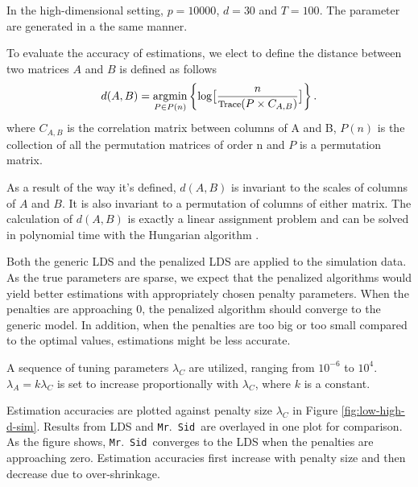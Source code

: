 \documentclass[fleqn]{article}
\let\oldref\ref
\renewcommand{\ref}[1]{(\oldref{#1})}
\newcommand{\mrsid}{{\sc \texttt{Mr}.~\texttt{Sid}}}
\newcommand{\argmin}{\operatornamewithlimits{argmin}}
\begin{document}
In the high-dimensional setting, $p = 10000$, $d = 30$ and $T = 100$. The parameter are generated in a the same manner.

To evaluate the accuracy of estimations, we elect to define the distance between two matrices $A$ and $B$ is defined as follows
\begin{equation}\label{eq:distance}
d(A,B) = \argmin_{P\in P(n)}\left\{\log\bigl[\frac{n}{\text{\footnotesize Trace}(P\times C_{A,B})}\bigr]\right\}.
\end{equation}
where $C_{A,B}$ is the correlation matrix between columns of A and B, $P(n)$ is the collection of all the permutation matrices of order n and $P$ is a permutation matrix.

As a result of the way it's defined, $d(A,B)$ is invariant to the scales of columns of $A$ and $B$. It is also invariant to a permutation of columns of either matrix. The calculation of $d(A,B)$ is exactly a linear assignment problem and can be solved in polynomial time with the Hungarian algorithm \cite{kuhn1955hungarian}.


Both the generic LDS and the penalized LDS are applied to the simulation data. As the true parameters are sparse, we expect that the penalized algorithms would yield better estimations with appropriately chosen penalty parameters. When the penalties are approaching 0, the penalized algorithm should converge to the generic model. In addition, when the penalties are too big or too small compared to the optimal values, estimations might be less accurate.

A sequence of tuning parameters $\lambda_C$ are utilized, ranging from $10^{-6}$ to $10^4$. $\lambda_A = k \lambda_C$ is set to increase proportionally with $\lambda_C$, where $k$ is a constant.

Estimation accuracies are plotted against penalty size $\lambda_C$ in Figure \oldref{fig:low-high-d-sim}. Results from LDS and \mrsid~are overlayed in one plot for comparison. As the figure shows, \mrsid~converges to the LDS when the penalties are approaching zero. Estimation accuracies first increase with penalty size and then decrease due to over-shrinkage.
\end{document}
